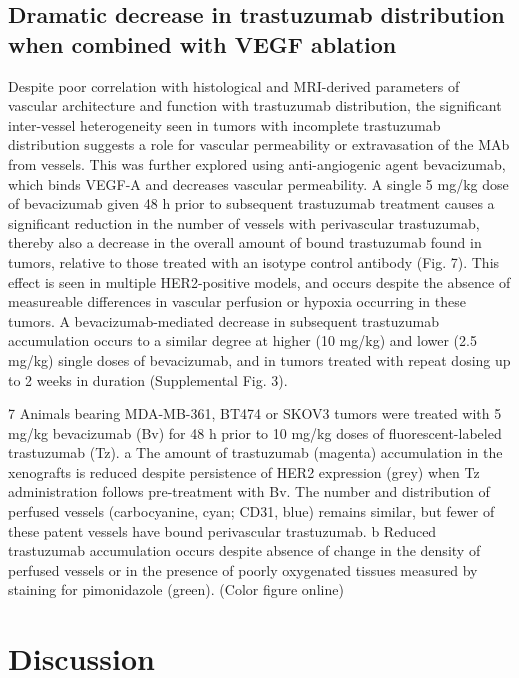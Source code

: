 \subsection{Dramatic decrease in trastuzumab distribution when combined with VEGF ablation}

Despite poor correlation with histological and MRI-derived parameters of vascular architecture and function with trastuzumab distribution, the significant inter-vessel heterogeneity seen in tumors with incomplete trastuzumab distribution suggests a role for vascular permeability or extravasation of the MAb from vessels.
This was further explored using anti-angiogenic agent bevacizumab, which binds VEGF-A and decreases vascular permeability.
A single 5 mg/kg dose of bevacizumab given 48 h prior to subsequent trastuzumab treatment causes a significant reduction in the number of vessels with perivascular trastuzumab, thereby also a decrease in the overall amount of bound trastuzumab found in tumors, relative to those treated with an isotype control antibody (Fig.
7).
This effect is seen in multiple HER2-positive models, and occurs despite the absence of measureable differences in vascular perfusion or hypoxia occurring in these tumors.
A bevacizumab-mediated decrease in subsequent trastuzumab accumulation occurs to a similar degree at higher (10 mg/kg) and lower (2.5 mg/kg) single doses of bevacizumab, and in tumors treated with repeat dosing up to 2 weeks in duration (Supplemental Fig.
3).

7
Animals bearing MDA-MB-361, BT474 or SKOV3 tumors were treated with 5 mg/kg bevacizumab (Bv) for 48 h prior to 10 mg/kg doses of fluorescent-labeled trastuzumab (Tz).
a The amount of trastuzumab (magenta) accumulation in the xenografts is reduced despite persistence of HER2 expression (grey) when Tz administration follows pre-treatment with Bv.
The number and distribution of perfused vessels (carbocyanine, cyan; CD31, blue) remains similar, but fewer of these patent vessels have bound perivascular trastuzumab.
b Reduced trastuzumab accumulation occurs despite absence of change in the density of perfused vessels or in the presence of poorly oxygenated tissues measured by staining for pimonidazole (green).
(Color figure online)

\section{Discussion}

